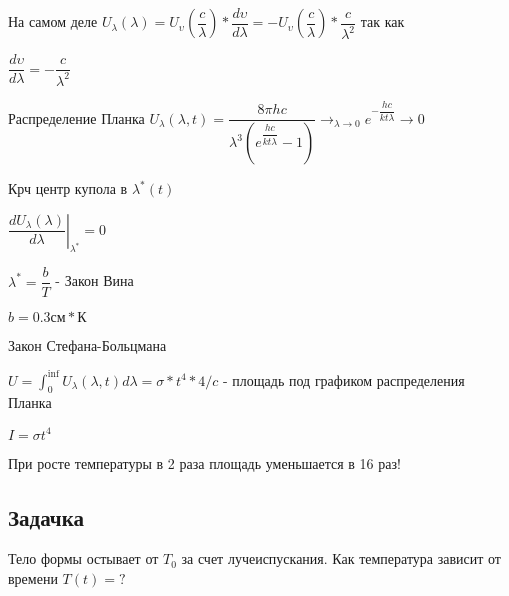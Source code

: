 \documentclass[15pt]{extarticle}
\begin{document}
На самом деле $U_{\lambda}(\lambda) = U_{\upsilon}(\dfrac{c}{\lambda}) * \dfrac{d \upsilon}{d \lambda} = - U_{\upsilon}(\dfrac{c}{\lambda}) * \dfrac{c}{\lambda^2}$ так как

$\dfrac{d \upsilon}{d \lambda} = - \dfrac{c}{\lambda^2}$

Распределение Планка $U_{\lambda}(\lambda, t) = \dfrac{8 \pi h c}{\lambda^3 (e^{\dfrac{hc}{kt \lambda}} - 1)} \to_{\lambda \to 0} e^{-\dfrac{hc}{kt \lambda}} \to 0$



Крч центр купола в $\lambda^{*}(t)$

$\left. \dfrac{ d U_{\lambda}(\lambda)}{d \lambda} \right\vert_{\lambda^{*}} = 0$

$\lambda^{*} = \dfrac{b}{T}$ - Закон Вина

$b = 0.3 \text{см} * \text{К}$

Закон Стефана-Больцмана

$U = \int_0^{\inf}{U_{\lambda}(\lambda, t) d \lambda} = \sigma * t^4 * 4 / c$ - площадь под графиком распределения Планка

$I = \sigma t^4$

При росте температуры в 2 раза площадь уменьшается в 16 раз!

\subsection{Задачка}

Тело формы остывает от $T_0$ за счет лучеиспускания. Как температура зависит от времени $T(t) = ?$
\end{document}
